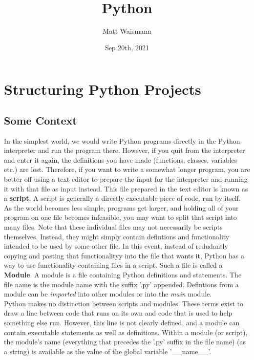 \documentclass{article}%
\title{Python}
\date{Sep 20th, 2021}
\author{Matt Waismann}
\begin{document}
\maketitle

\section{Structuring Python Projects}


\subsection{Some Context}

In the simplest world, we would write Python programs directly in the Python
interpreter and run the program there. However, if you quit from the
interpreter and enter it again, the definitions you have made
(functions, classes, variables etc.) are lost. Therefore, if you want to 
write a somewhat longer program, you are better off using a text editor to
prepare the input for the interpreter and running it with that file as input 
instead. This file prepared in the text editor is known as a \textbf{script}.
A script is generally a directly executable piece of code, run by itself.\\

As the world becomes less simple, programs get larger, and holding all of your
program on one file becomes infeasible, you may want to split that script 
into many files. Note that these individual files may not necessarily be 
scripts themselves. Instead, they might simply contain defintions and
functionality intended to be used by some other file. In this event, instead of 
redudantly copying and pasting that functionalityy into the file that wants it,
Python has a way to use functionality-containing files in a script. Such a file 
is called a \textbf{Module}. A module is a file containing Python definitions
and statements. The file name is the module name with the suffix '.py' appended.
Defintions from a module can be \textit{imported} into other modules or into 
the \textit{main} module. \\

Python makes no distinction between scripts and modules. These terms
exist to draw a line between code that runs on its own and code that is used
to help something else run. However, this line is not clearly defined, and a
module can contain executable statements as well as definitions.
Within a module (or script), the module's name (everything that precedes the
'.py' suffix in the file name) (as a string) is available as the value of the
global variable '\_\_name\_\_'. \\
\end{document}
